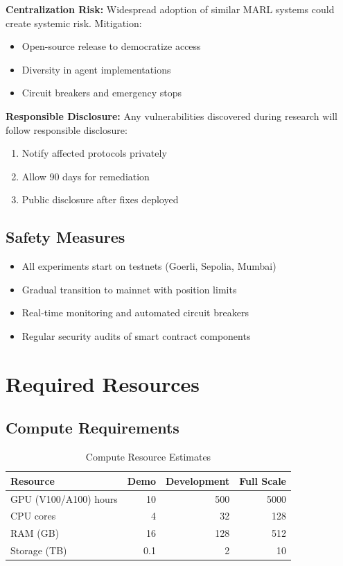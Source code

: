 \documentclass[11pt,a4paper]{article}
\begin{document}
\textbf{Centralization Risk:} Widespread adoption of similar MARL systems could create systemic risk. Mitigation:
\begin{itemize}[leftmargin=2em]
    \item Open-source release to democratize access
    \item Diversity in agent implementations
    \item Circuit breakers and emergency stops
\end{itemize}

\textbf{Responsible Disclosure:} Any vulnerabilities discovered during research will follow responsible disclosure:
\begin{enumerate}[leftmargin=2em]
    \item Notify affected protocols privately
    \item Allow 90 days for remediation
    \item Public disclosure after fixes deployed
\end{enumerate}

\subsection{Safety Measures}

\begin{itemize}[leftmargin=2em]
    \item All experiments start on testnets (Goerli, Sepolia, Mumbai)
    \item Gradual transition to mainnet with position limits
    \item Real-time monitoring and automated circuit breakers
    \item Regular security audits of smart contract components
\end{itemize}

\section{Required Resources}\label{sec:resources}

\subsection{Compute Requirements}

\begin{table}[H]
\centering
\caption{Compute Resource Estimates}
\label{tab:compute}
\begin{tabular}{@{}lrrr@{}}
\toprule
\textbf{Resource} & \textbf{Demo} & \textbf{Development} & \textbf{Full Scale} \\
\midrule
GPU (V100/A100) hours & 10 & 500 & 5000 \\
CPU cores & 4 & 32 & 128 \\
RAM (GB) & 16 & 128 & 512 \\
Storage (TB) & 0.1 & 2 & 10 \\
\bottomrule
\end{tabular}
\end{table}
\end{document}

